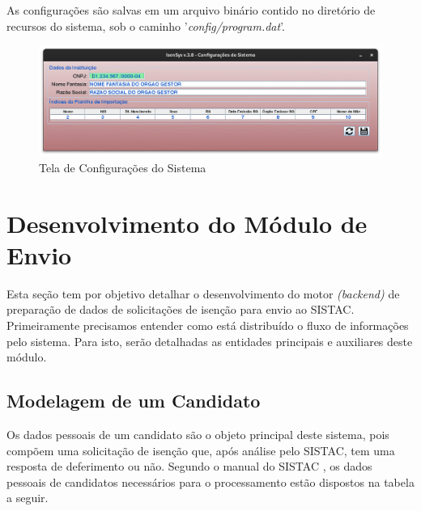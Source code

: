 \documentclass[
	12pt,			%
	openright,		%
	oneside,	
	a4paper,		%
	english,		%
	brazil			%
]{abntex2/abntex2}  %
\begin{document}
			As configurações são salvas em um arquivo binário contido no diretório de recursos do sistema, sob o caminho '\textit{config/program.dat}'.

			\begin{figure}[h]
				\begin{center}
					
					\caption{Tela de Configurações do Sistema}
					\label{configs-img}
					
					\includegraphics[scale=0.45]{img/configs-ui}
					
				\end{center}
			\end{figure}

		\section{Desenvolvimento do Módulo de Envio}
	
			Esta seção tem por objetivo detalhar o desenvolvimento do motor \textit{(backend)} de preparação de dados de solicitações de isenção para envio ao SISTAC. Primeiramente precisamos entender como está distribuído o fluxo de informações pelo sistema. Para isto, serão detalhadas as entidades principais e auxiliares deste módulo.
	
			\subsection{Modelagem de um Candidato} \label{candidato}
	
				Os dados pessoais de um candidato são o objeto principal deste sistema, pois compõem uma solicitação de isenção que, após análise pelo SISTAC, tem uma resposta de deferimento ou não. Segundo o manual do SISTAC \cite{sistac-formatos}, os dados pessoais de candidatos necessários para o processamento estão dispostos na tabela a seguir.
\end{document}
